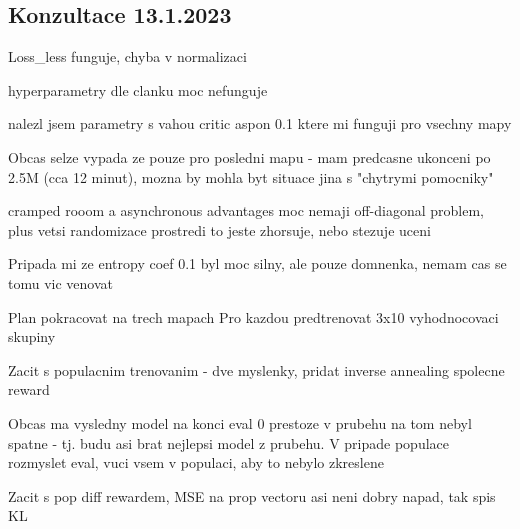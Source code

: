 \documentclass{report}
\begin{document}
\subsection*{Konzultace 13.1.2023}
\begin{list}{}{}
    \item Loss\_less funguje, chyba v normalizaci
    \item hyperparametry dle clanku moc nefunguje
    \item nalezl jsem parametry s vahou critic aspon 0.1 ktere mi funguji pro vsechny mapy
    \item Obcas selze vypada ze pouze pro posledni mapu - mam predcasne ukonceni po 2.5M (cca 12 minut), mozna by mohla byt situace jina s "chytrymi pomocniky"
    \item cramped rooom a asynchronous advantages moc nemaji off-diagonal problem, plus vetsi randomizace prostredi to jeste zhorsuje, nebo stezuje uceni
    \item Pripada mi ze entropy coef 0.1 byl moc silny, ale pouze domnenka, nemam cas se tomu vic venovat
    \item Plan pokracovat na trech mapach Pro kazdou predtrenovat 3x10 vyhodnocovaci skupiny
    \item Zacit s populacnim trenovanim - dve myslenky, pridat inverse annealing spolecne reward
    \item Obcas ma vysledny model na konci eval 0 prestoze v prubehu na tom nebyl spatne - tj. budu asi brat nejlepsi model z prubehu. 
        V pripade populace rozmyslet eval, vuci vsem v populaci, aby to nebylo zkreslene
    \item Zacit s pop diff rewardem, MSE na prop vectoru asi neni dobry napad, tak spis KL  
\end{list}
\end{document}
